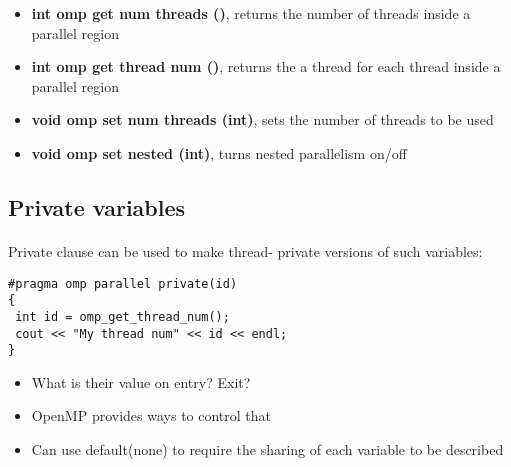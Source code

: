 \documentclass[%
oneside,                 %
final,                   %
10pt]{article}
\begin{document}
\begin{itemize}
\item \textbf{int omp get num threads ()}, returns the number of threads inside a parallel region

\item \textbf{int omp get thread num ()},  returns the  a thread for each thread inside a parallel region

\item \textbf{void omp set num threads (int)}, sets the number of threads to be used

\item \textbf{void omp set nested (int)},  turns nested parallelism on/off
\end{itemize}

\noindent



\subsection*{Private variables}

\paragraph{}
Private clause can be used to make thread- private versions of such variables: 






\begin{verbatim}
#pragma omp parallel private(id)
{
 int id = omp_get_thread_num();
 cout << "My thread num" << id << endl; 
}

\end{verbatim}

\begin{itemize}
\item What is their value on entry? Exit?

\item OpenMP provides ways to control that

\item Can use default(none) to require the sharing of each variable to be described
\end{itemize}

\noindent
\end{document}
